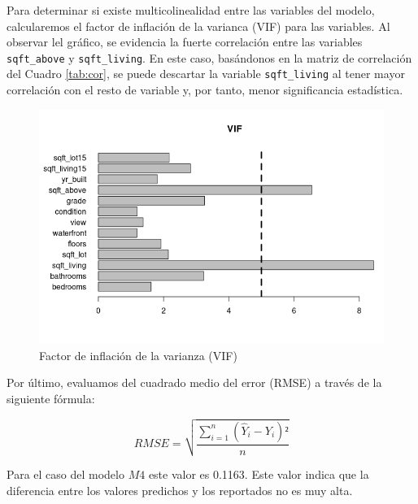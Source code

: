 \documentclass[10pt,letterpaper]{article}
\begin{document}
Para determinar si existe multicolinealidad entre las variables del modelo, calcularemos el factor de inflación de la varianca (VIF) para las variables. Al observar lel gráfico, se evidencia la fuerte correlación entre las variables \texttt{sqft\_above} y \texttt{sqft\_living}. En este caso, basándonos en la matriz de correlación del Cuadro \ref{tab:cor}, se puede descartar la variable \texttt{sqft\_living} al tener mayor correlación con el resto de variable y, por tanto, menor significancia estadística.

\begin{figure}[!htbp]
	\center
	\includegraphics[scale=0.5]{vif.png}
	\caption{Factor de inflación de la varianza (VIF)}
	\label{fig:vif}
\end{figure}

Por último, evaluamos del cuadrado medio del error (RMSE) a través de la siguiente fórmula:

\[
RMSE = \sqrt{\frac
	{\sum_{i=1}^{n}{(\hat{Y}_i-Y_i)²}}
		{n}}
\]

Para el caso del modelo $M4$ este valor es 0.1163. Este valor indica que la diferencia entre los valores predichos y los reportados no es muy alta.
\end{document}
